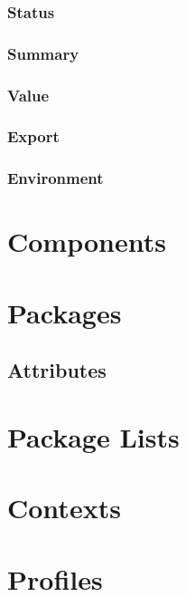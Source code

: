 \documentclass[11pt,a4paper,titlepage]{article}
\begin{document}
\subsubsection{Status}

\subsubsection{Summary}

\subsubsection{Value}

\subsubsection{Export}

\subsubsection{Environment}

\section{Components}

\section{Packages}

\subsection{Attributes}

\section{Package Lists}

\section{Contexts}

\section{Profiles}
\end{document}
